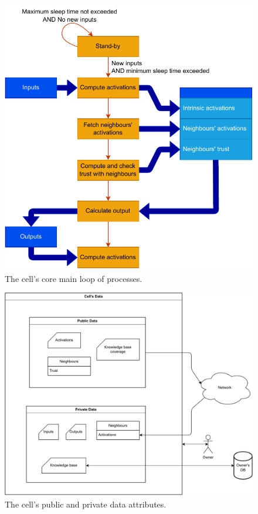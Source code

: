 \begin{figure}[h!]
    \centering
    \includegraphics[width=12cm]{figures/chapter4/cell/processes.pdf}
    \caption{The cell's core main loop of processes.}
    \label{fig:cellprocesses}
\end{figure}

\begin{figure}[h!]
    \centering
    \includegraphics[width=\linewidth]{figures/chapter4/cell/data.pdf}
    \caption{The cell's public and private data attributes.}
    \label{fig:celldata}
\end{figure}


